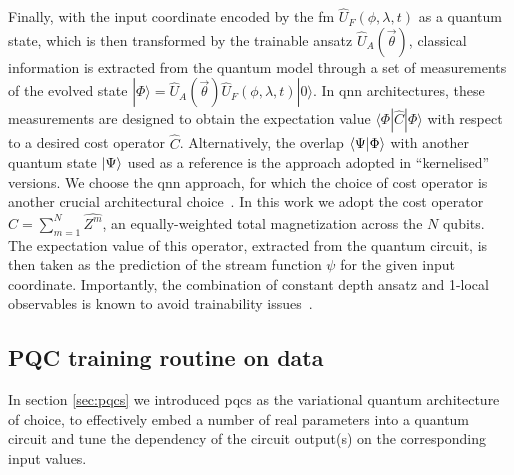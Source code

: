 \documentclass[aps,pra,a4paper,twocolumn,longbibliography,groupedaddress]{revtex4-2}
\begin{document}
Finally, with the input coordinate encoded by the \gls{fm} $\hat{U}_F(\phi, \lambda, t)$ as a quantum state, which is then transformed by the trainable ansatz $\hat{U}_A(\vec{\theta})$, classical information is extracted from the quantum model through a set of measurements of the evolved state $|\Phi\rangle = \hat{U}_A(\vec{\theta}) \hat{U}_F(\phi, \lambda, t) |0\rangle$. 
In \gls{qnn} architectures, these measurements are designed to obtain the expectation value $\langle\Phi|\hat{C}|\Phi\rangle$  with respect to a desired cost operator $\hat{C}$. Alternatively, the overlap $\braket{\Psi|\Phi}$ with another quantum state $\ket{\Psi}$ used as a reference is the approach adopted in ``kernelised'' versions. 
We choose the \gls{qnn} approach, for which the choice of cost operator is another crucial architectural choice~\cite{kyriienko2021solving}. In this work we adopt the cost operator $\hat{C} = \sum^N_{m=1} \hat{Z^m}$, an equally-weighted total magnetization across the $N$ qubits. The expectation value of this operator, extracted from the quantum circuit, is then taken as the prediction of the stream function $\psi$ for the given input coordinate. Importantly, the combination of constant depth ansatz and 1-local observables is known to avoid trainability issues~\cite{cerezo2021cost}. 

\subsection{PQC training routine on data}

In section \ref{sec:pqcs} we introduced \glspl{pqc} as the variational quantum architecture of choice, to effectively embed a number of real parameters into a quantum circuit and tune the dependency of the circuit output(s) on the corresponding input values. 
\end{document}
